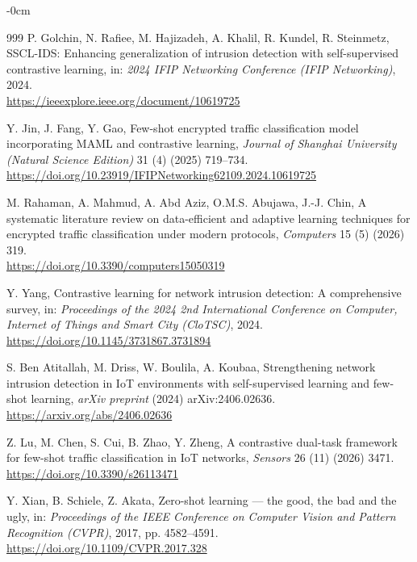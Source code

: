 \documentclass[sensors,article,submit,moreauthors]{Definitions/mdpi}
\begin{document}
\begin{adjustwidth}{-\extralength}{0cm}
\begin{thebibliography}{999}
P. Golchin, N. Rafiee, M. Hajizadeh, A. Khalil, R. Kundel, R. Steinmetz, SSCL-IDS: Enhancing generalization of intrusion detection with self-supervised contrastive learning, in: \textit{2024 IFIP Networking Conference (IFIP Networking)}, 2024. \\
\url{https://ieeexplore.ieee.org/document/10619725}



Y. Jin, J. Fang, Y. Gao, Few-shot encrypted traffic classification model incorporating MAML and contrastive learning, \textit{Journal of Shanghai University (Natural Science Edition)} 31 (4) (2025) 719--734. \\
\url{https://doi.org/10.23919/IFIPNetworking62109.2024.10619725}



M. Rahaman, A. Mahmud, A. Abd Aziz, O.M.S. Abujawa, J.-J. Chin, A systematic literature review on data-efficient and adaptive learning techniques for encrypted traffic classification under modern protocols, \textit{Computers} 15 (5) (2026) 319. \\
\url{https://doi.org/10.3390/computers15050319}



Y. Yang, Contrastive learning for network intrusion detection: A comprehensive survey, in: \textit{Proceedings of the 2024 2nd International Conference on Computer, Internet of Things and Smart City (CloTSC)}, 2024. \\
\url{https://doi.org/10.1145/3731867.3731894}



S. Ben Atitallah, M. Driss, W. Boulila, A. Koubaa, Strengthening network intrusion detection in IoT environments with self-supervised learning and few-shot learning, \textit{arXiv preprint} (2024) arXiv:2406.02636. \\
\url{https://arxiv.org/abs/2406.02636}



Z. Lu, M. Chen, S. Cui, B. Zhao, Y. Zheng, A contrastive dual-task framework for few-shot traffic classification in IoT networks, \textit{Sensors} 26 (11) (2026) 3471. \\
\url{https://doi.org/10.3390/s26113471}



Y. Xian, B. Schiele, Z. Akata, Zero-shot learning --- the good, the bad and the ugly, in: \textit{Proceedings of the IEEE Conference on Computer Vision and Pattern Recognition (CVPR)}, 2017, pp. 4582--4591. \\
\url{https://doi.org/10.1109/CVPR.2017.328}




\end{thebibliography}
\end{adjustwidth}
\end{document}
